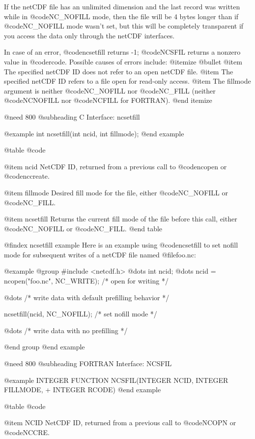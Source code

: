 If the netCDF file has an unlimited dimension and the last record was
written while in @code{NC_NOFILL} mode, then the file will be 4 bytes
longer than if @code{NC_NOFILL} mode wasn't set, but this will be
completely transparent if you access the data only through the netCDF
interfaces.

In case of an error, @code{ncsetfill} returns -1; @code{NCSFIL} returns a
nonzero value in @code{rcode}.  Possible causes of errors include:
@itemize @bullet
@item
The specified netCDF ID does not refer to an open netCDF file.
@item
The specified netCDF ID refers to a file open for read-only access.
@item
The fillmode argument is neither @code{NC_NOFILL} nor @code{NC_FILL}
(neither @code{NCNOFILL} nor @code{NCFILL} for FORTRAN).
@end itemize

@need 800
@subheading C Interface:  ncsetfill

@example
int ncsetfill(int ncid, int fillmode);
@end example

@table @code

@item ncid
NetCDF ID, returned from a previous call to @code{ncopen} or @code{nccreate}.

@item fillmode
Desired fill mode for the file, either @code{NC_NOFILL} or
@code{NC_FILL}.

@item ncsetfill
Returns the current fill mode of the file before this call, either
@code{NC_NOFILL} or @code{NC_FILL}.
@end table

@findex ncsetfill example
Here is an example using @code{ncsetfill} to set nofill mode for
subsequent writes of a netCDF file named @file{foo.nc}:

@example
@group
#include <netcdf.h>
   @dots{}
int ncid;
   @dots{}
ncid = ncopen("foo.nc", NC_WRITE);  /* open for writing */

   @dots{}          /* write data with default prefilling behavior */

ncsetfill(ncid, NC_NOFILL);      /* set nofill mode */

   @dots{}          /* write data with no prefilling */

@end group
@end example

@need 800
@subheading FORTRAN Interface:  NCSFIL

@example
      INTEGER FUNCTION NCSFIL(INTEGER NCID, INTEGER FILLMODE,
     +                        INTEGER RCODE)
@end example

@table @code

@item NCID
NetCDF ID, returned from a previous call to @code{NCOPN} or @code{NCCRE}.

